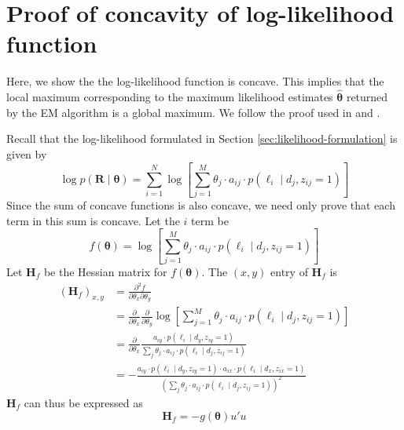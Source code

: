\chapter{Proof of concavity of log-likelihood function}\label{sec:proof-log-lik}

Here, we show the the log-likelihood function is concave. This implies that the local maximum corresponding to the maximum likelihood estimates $\hat{\bm\theta}$ returned by the EM algorithm is a global maximum. We follow the proof used in \cite{Jiang2009} and \cite{Libo2009}.  

Recall that the log-likelihood formulated in Section \ref{sec:likelihood-formulation} is given by
\begin{equation}
    \log p(\bm{R}\mid\bm{\theta}) = \sum_{i=1}^N \log \left[\sum_{j=1}^M \theta_j\cdot a_{ij}\cdot p(\ell_i\mid d_j, z_{ij}=1)\right]
\end{equation}
Since the sum of concave functions is also concave, we need only prove that each term in this sum is concave. Let the $i$ term be
\begin{equation}
    f(\bm\theta) = \log \left[\sum_{j=1}^M \theta_j\cdot a_{ij}\cdot p(\ell_i\mid d_j, z_{ij}=1)\right]
\end{equation}
Let $\mathrm{\mathbf{H}}_f$ be the Hessian matrix for $f(\bm\theta)$. The $(x,y)$ entry of $\mathrm{\mathbf{H}}_f$ is 
\begin{equation}
    \begin{split}
        \left(\mathbf{H}_{f}\right)_{x, y} & =\frac{\partial^{2} f}{\partial \theta_{x} \partial \theta_{y}} \\
        & =\frac{\partial}{\partial \theta_{x}} \frac{\partial}{\partial \theta_{y}} \log \left[\sum_{j=1}^{M} \theta_{j} \cdot a_{i j} \cdot p\left(\ell_{i} \mid d_{j}, z_{i j}=1\right)\right] \\
        & =\frac{\partial}{\partial \theta_{x}} \frac{a_{i y} \cdot p\left(\ell_{i} \mid d_{y}, z_{i y}=1\right)}{\sum_{j} \theta_{j} \cdot a_{i j} \cdot p\left(\ell_{i} \mid d_{j}, z_{i j}=1\right)} \\
        & =-\frac{a_{i y} \cdot p\left(\ell_{i} \mid d_{y}, z_{i y}=1\right) \cdot a_{i x} \cdot p\left(\ell_{i} \mid d_{x}, z_{i x}=1\right)}{\left(\sum_{j} \theta_{j} \cdot a_{i j} \cdot p\left(\ell_{i} \mid d_{j}, z_{i j}=1\right)\right)^{2}}
    \end{split}
\end{equation}
$\mathrm{\mathbf{H}}_f$ can thus be expressed as 
\begin{equation}
    \mathrm{\mathbf{H}}_f = -g(\bm\theta)u'u
\end{equation}
